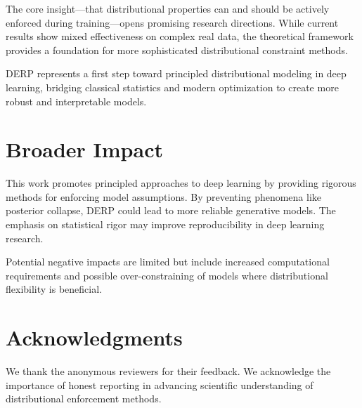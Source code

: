 \documentclass{article}
\begin{document}
The core insight—that distributional properties can and should be actively enforced during training—opens promising research directions. While current results show mixed effectiveness on complex real data, the theoretical framework provides a foundation for more sophisticated distributional constraint methods.

DERP represents a first step toward principled distributional modeling in deep learning, bridging classical statistics and modern optimization to create more robust and interpretable models.

\section*{Broader Impact}

This work promotes principled approaches to deep learning by providing rigorous methods for enforcing model assumptions. By preventing phenomena like posterior collapse, DERP could lead to more reliable generative models. The emphasis on statistical rigor may improve reproducibility in deep learning research.

Potential negative impacts are limited but include increased computational requirements and possible over-constraining of models where distributional flexibility is beneficial.

\section*{Acknowledgments}

We thank the anonymous reviewers for their feedback. We acknowledge the importance of honest reporting in advancing scientific understanding of distributional enforcement methods.

\small


\end{document}
